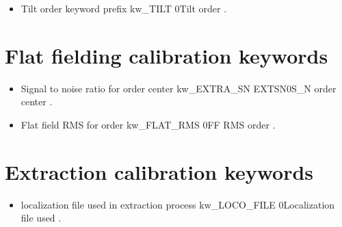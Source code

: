 \begin{itemize}

\item {}
{Tilt order keyword prefix}
{kw\_TILT}
{}{0}{Tilt order}
{\calSLIT}{\spirouKeywords}{\calSLIT.\progMAIN}

\end{itemize}





\section{Flat fielding calibration keywords}
\label{ch:output_keywords:flatfielding}

\begin{itemize}

\item {}
{Signal to noise ratio for order center}
{kw\_EXTRA\_SN}
{EXTSN}{0}{S\_N order center}
{\calFFraw}{\spirouKeywords}{\calFFraw.\progMAIN}


\item {}
{Flat field RMS for order}
{kw\_FLAT\_RMS}
{}{0}{FF RMS order}
{\calFFraw}{\spirouKeywords}{\calFFraw.\progMAIN}

\end{itemize}





\section{Extraction calibration keywords}
\label{ch:output_keywords:extraction}

\begin{itemize}

\item {}
{localization file used in extraction process}
{kw\_LOCO\_FILE}
{}{0}{Localization file used}
{\calextractRAW}{\spirouKeywords}{\calextractRAW.\progMAIN}

\end{itemize}





